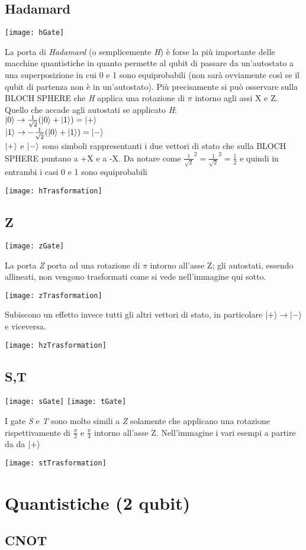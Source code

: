 \subsection{Hadamard}
\begin{center}
\texttt{[image: hGate]}
\end{center}
La porta di \textit{Hadamard} (o semplicemente \textit{H}) è forse la più importante delle macchine quantistiche in quanto permette al qubit di passare da un'autostato a una superposizione in cui 0 e 1 sono equiprobabili (non sarà ovviamente così se il qubit di partenza non è in un'autostato). Più precisamente si può osservare sulla BLOCH SPHERE che \textit{H} applica una rotazione di $\pi$ intorno agli assi X e Z.\\
Quello che accade agli autostati se applicato \textit{H}:\\
$\ket{0} \rightarrow \frac{1}{\sqrt{2}}(\ket{0} + \ket{1}) = \ket{+}$\\
$\ket{1} \rightarrow -\frac{1}{\sqrt{2}}(\ket{0} + \ket{1}) = \ket{-}$\\
$\ket{+}$ e $\ket{-}$ sono simboli rappresentanti i due vettori di stato che sulla BLOCH SPHERE puntano a +X e a -X. Da notare come $\frac{1}{\sqrt{2}}^2 = \frac{1}{\sqrt{2}}^2 = \frac{1}{2}$ e quindi in entrambi i casi 0 e 1 sono equiprobabili
\begin{center}
\texttt{[image: hTrasformation]}
\end{center}
\subsection{Z}
\begin{center}
\texttt{[image: zGate]}
\end{center}
La porta \textit{Z} porta ad una rotazione di $\pi$ intorno all'asse Z; gli autostati, essendo allineati, non vengono trasformati come si vede nell'immagine qui sotto.
\begin{center}
\texttt{[image: zTrasformation]}
\end{center}
Subiscono un effetto invece tutti gli altri vettori di stato, in particolare $\ket{+} \rightarrow \ket{-}$ e viceversa.
\begin{center}
\texttt{[image: hzTrasformation]}
\end{center}
\subsection{S,T}
\begin{center}
\texttt{[image: sGate]}
\texttt{[image: tGate]}
\end{center}
I gate \textit{S} e \textit{T} sono molto simili a \textit{Z} solamente che applicano una rotazione rispettivamente di $\frac{\pi}{2}$ e $\frac{\pi}{4}$ intorno all'asse Z. Nell'immagine i vari esempi a partire da da $\ket{+}$
\begin{center}
\texttt{[image: stTrasformation]}
\end{center}

\section{Quantistiche (2 qubit)}
\subsection{CNOT}
